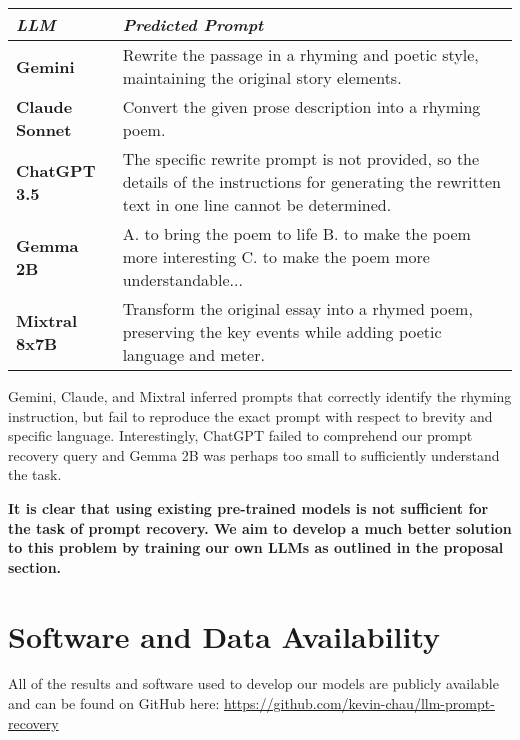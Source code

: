 \documentclass{article}
\theoremstyle{plain}
\theoremstyle{definition}
\theoremstyle{remark}
\begin{document}
\begin{center}
\begin{tabular}{ | m{3.5em} | m{18em}| } 
\hline
  \textbf{\textit{LLM}} & \textbf{\textit{Predicted Prompt}} \\ 
  \hline
  \textbf{Gemini} & Rewrite the passage in a rhyming and poetic style, maintaining the original story elements. \\ 
  \hline
  \textbf{Claude Sonnet} & Convert the given prose description into a rhyming poem. \\ 
  \hline
  \textbf{ChatGPT 3.5} & The specific rewrite prompt is not provided, so the details of the instructions for generating the rewritten text in one line cannot be determined. \\ 
  \hline
  \textbf{Gemma 2B} & A. to bring the poem to life B. to make the poem more interesting C. to make the poem more understandable...  \\ 
  \hline
  \textbf{Mixtral 8x7B} & Transform the original essay into a rhymed poem, preserving the key events while adding poetic language and meter. \\ 
  \hline
\end{tabular}
\end{center}

Gemini, Claude, and Mixtral inferred prompts that correctly identify the rhyming instruction, but fail to reproduce the exact prompt with respect to brevity and specific language. Interestingly, ChatGPT failed to comprehend our prompt recovery query and Gemma 2B was perhaps too small to sufficiently understand the task.

\textbf{It is clear that using existing pre-trained models is not sufficient for the task of prompt recovery. We aim to develop a much better solution to this problem by training our own LLMs as outlined in the proposal section.}

\section*{Software and Data Availability}
All of the results and software used to develop our models are publicly available and can be found on GitHub here: \url{https://github.com/kevin-chau/llm-prompt-recovery}

\nocite{llm-prompt-recovery}
\nocite{roberts2022scaling}
\nocite{mixtral}


\end{document}
